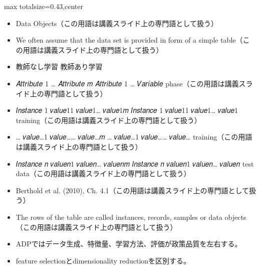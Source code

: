 \clearpage
{}
\begin{minipage}[t]{0.405\textwidth}
\begin{adjustbox}{max totalsize={\textwidth}{0.43\textheight},center}
\begin{minipage}{\textwidth}\scriptsize
{}\begin{itemize}
\item Data Objects（この用語は講義スライド上の専門語として扱う）
\item We often assume that the data set is provided in form of a simple table（この用語は講義スライド上の専門語として扱う）
\item 教師なし学習 教師あり学習
\item 𝐴𝑡𝑡𝑟𝑖𝑏𝑢𝑡𝑒 1 … 𝐴𝑡𝑡𝑟𝑖𝑏𝑢𝑡𝑒 𝑚 𝐴𝑡𝑡𝑟𝑖𝑏𝑢𝑡𝑒 1 … 𝑉𝑎𝑟𝑖𝑎𝑏𝑙𝑒 phase（この用語は講義スライド上の専門語として扱う）
\item 𝐼𝑛𝑠𝑡𝑎𝑛𝑐𝑒 1 𝑣𝑎𝑙𝑢𝑒11 𝑣𝑎𝑙𝑢𝑒1… 𝑣𝑎𝑙𝑢𝑒1𝑚 𝐼𝑛𝑠𝑡𝑎𝑛𝑐𝑒 1 𝑣𝑎𝑙𝑢𝑒11 𝑣𝑎𝑙𝑢𝑒1… 𝑣𝑎𝑙𝑢𝑒1 training（この用語は講義スライド上の専門語として扱う）
\item … 𝑣𝑎𝑙𝑢𝑒…1 𝑣𝑎𝑙𝑢𝑒…… 𝑣𝑎𝑙𝑢𝑒…𝑚 … 𝑣𝑎𝑙𝑢𝑒…1 𝑣𝑎𝑙𝑢𝑒…… 𝑣𝑎𝑙𝑢𝑒… training（この用語は講義スライド上の専門語として扱う）
\item 𝐼𝑛𝑠𝑡𝑎𝑛𝑐𝑒 𝑛 𝑣𝑎𝑙𝑢𝑒𝑛1 𝑣𝑎𝑙𝑢𝑒𝑛… 𝑣𝑎𝑙𝑢𝑒𝑛𝑚 𝐼𝑛𝑠𝑡𝑎𝑛𝑐𝑒 𝑛 𝑣𝑎𝑙𝑢𝑒𝑛1 𝑣𝑎𝑙𝑢𝑒𝑛… 𝑣𝑎𝑙𝑢𝑒𝑛 test data（この用語は講義スライド上の専門語として扱う）
\item Berthold et al. (2010), Ch. 4.1（この用語は講義スライド上の専門語として扱う）
\item The rows of the table are called instances, records, samples or data objects（この用語は講義スライド上の専門語として扱う）
\end{itemize}\begin{itemize}
\item ADPではデータ生成、特徴量、学習方法、評価が政策品質を左右する。
\item feature selectionとdimensionality reductionを区別する。
\end{itemize}
\end{minipage}
\end{adjustbox}
\end{minipage}\hfill
